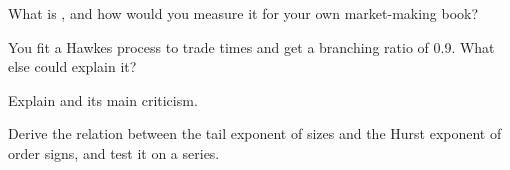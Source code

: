 \begin{interviewq}\label{iq:rs:trade-flow-features:3}
What is , and how would you measure it for your own market-making book?
\end{interviewq}

\begin{interviewq}\label{iq:rs:trade-flow-features:4}
You fit a Hawkes process to trade times and get a branching ratio of 0.9. What else could explain it?
\end{interviewq}

\begin{interviewq}\label{iq:rs:trade-flow-features:5}
Explain  and its main criticism.
\end{interviewq}

\begin{interviewq}\label{iq:rs:trade-flow-features:6}
Derive the relation between the tail exponent of  sizes and the Hurst exponent of order signs, and test it on a series.
\end{interviewq}
